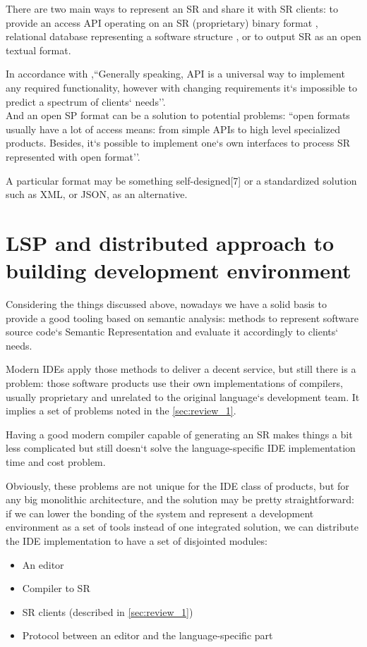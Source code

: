 There are two main ways to represent an SR and share it with SR clients: to
provide an access API operating on an SR (proprietary) binary format \cite{Cannon, FreeSoftwareFoundation2016},
relational database representing a software structure \cite{Linton1983}, or to output SR as an
open textual format\cite{TheRustTeam2016}.

In accordance with \cite{Zouev2005},``Generally speaking, API is a universal way to implement any required
functionality, however with changing requirements it`s impossible to predict a
spectrum of clients` needs''.\\
And an open SP format can be a solution to potential problems: ``open formats
usually have a lot of access means: from simple APIs to high level specialized
products. Besides, it`s possible to implement one`s own interfaces to process SR
represented with open format''.

A particular format may be something self-designed[7] or a standardized
solution such as XML\cite{Germon}, or JSON\cite{ECMA-4042013}, as an alternative.

\newpage
\section{LSP and distributed approach to building development
environment}
\label{sec:review_3}

Considering the things discussed above, nowadays we have a solid basis to
provide a good tooling based on semantic analysis: methods to represent
software source code`s Semantic Representation and evaluate it accordingly to
clients` needs.

Modern IDEs apply those methods to deliver a decent service, but still there is a
problem: those software products use their own implementations of compilers,
usually proprietary and unrelated to the original language`s development team.
It implies a set of problems noted in the \ref{sec:review_1}.

Having a good modern compiler capable of generating an SR makes things a bit
less complicated but still doesn`t solve the language-specific IDE
implementation time and cost problem.

Obviously, these problems are not unique for the IDE class of products, but for
any big monolithic architecture, and the solution may be pretty straightforward:
if we can lower the bonding of the system and represent a development
environment as a set of tools instead of one integrated solution, we can
distribute the IDE implementation to have a set of disjointed modules:
\begin{itemize}
    \item An editor
    \item Compiler to SR
    \item SR clients (described in \ref{sec:review_1})
    \item Protocol between an editor and the language-specific part
\end{itemize}

